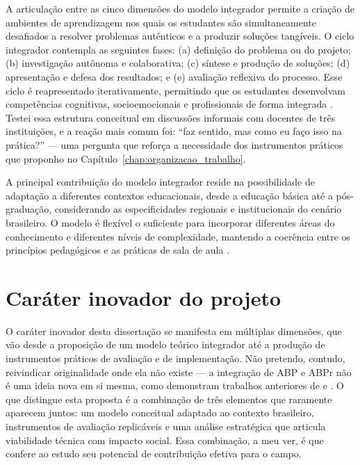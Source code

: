 A articulação entre as cinco dimensões do modelo integrador permite a criação de ambientes de aprendizagem nos quais os estudantes são simultaneamente desafiados a resolver problemas autênticos e a produzir soluções tangíveis. O ciclo integrador contempla as seguintes fases: (a) definição do problema ou do projeto; (b) investigação autônoma e colaborativa; (c) síntese e produção de soluções; (d) apresentação e defesa dos resultados; e (e) avaliação reflexiva do processo. Esse ciclo é reapresentado iterativamente, permitindo que os estudantes desenvolvam competências cognitivas, socioemocionais e profissionais de forma integrada \cite{AUSUBEL2000}. Testei essa estrutura conceitual em discussões informais com docentes de três instituições, e a reação mais comum foi: ``faz sentido, mas como eu faço isso na prática?'' — uma pergunta que reforça a necessidade dos instrumentos práticos que proponho no Capítulo~\ref{chap:organizacao_trabalho}.

A principal contribuição do modelo integrador reside na possibilidade de adaptação a diferentes contextos educacionais, desde a educação básica até a pós-graduação, considerando as especificidades regionais e institucionais do cenário brasileiro. O modelo é flexível o suficiente para incorporar diferentes áreas do conhecimento e diferentes níveis de complexidade, mantendo a coerência entre os princípios pedagógicos e as práticas de sala de aula \cite{BACICH2018}.

\section{Caráter inovador do projeto}
\label{sec:caracter_inovador}

O caráter inovador desta dissertação se manifesta em múltiplas dimensões, que vão desde a proposição de um modelo teórico integrador até a produção de instrumentos práticos de avaliação e de implementação. Não pretendo, contudo, reivindicar originalidade onde ela não existe — a integração de ABP e ABPr não é uma ideia nova em si mesma, como demonstram trabalhos anteriores de \cite{THOMAS2000} e \cite{BARRON1998}. O que distingue esta proposta é a combinação de três elementos que raramente aparecem juntos: um modelo conceitual adaptado ao contexto brasileiro, instrumentos de avaliação replicáveis e uma análise estratégica que articula viabilidade técnica com impacto social. Essa combinação, a meu ver, é que confere ao estudo seu potencial de contribuição efetiva para o campo.


